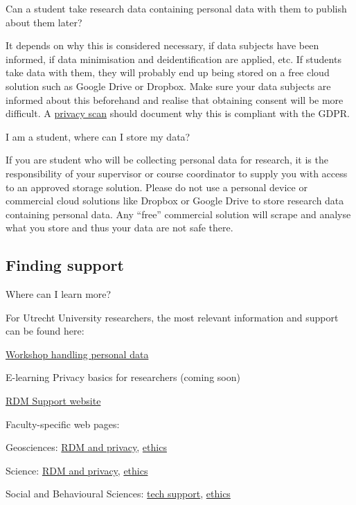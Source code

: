 \documentclass[
]{book}
\begin{document}
Can a student take research data containing personal data with them to publish about them later?

It depends on why this is considered necessary, if data subjects have been informed, if data minimisation and deidentification are applied, etc. If students take data with them, they will probably end up being stored on a free cloud solution such as Google Drive or Dropbox. Make sure your data subjects are informed about this beforehand and realise that obtaining consent will be more difficult. A \protect\hyperlink{privacy-scan}{privacy scan} should document why this is compliant with the GDPR.

I am a student, where can I store my data?

If you are student who will be collecting personal data for research, it is the responsibility of your supervisor or course coordinator to supply you with access to an approved storage solution. Please do not use a personal device or commercial cloud solutions like Dropbox or Google Drive to store research data containing personal data. Any ``free'' commercial solution will scrape and analyse what you store and thus your data are not safe there.

\hypertarget{support}{%
\subsection{Finding support}\label{support}}

Where can I learn more?

For Utrecht University researchers, the most relevant information and support can be found here:

\href{https://www.uu.nl/en/research/research-data-management/training-workshops/handling-personal-data-in-research}{Workshop handling personal data}

E-learning Privacy basics for researchers (coming soon)

\href{https://www.uu.nl/rdm}{RDM Support website}

Faculty-specific web pages:

Geosciences: \href{https://geo-data-support.sites.uu.nl/}{RDM and privacy}, \href{https://sciencegeo-erb.sites.uu.nl/}{ethics}

Science: \href{https://science-data-support.sites.uu.nl/}{RDM and privacy}, \href{https://sciencegeo-erb.sites.uu.nl/}{ethics}

Social and Behavioural Sciences: \href{https://techsupport.fss.uu.nl/}{tech support}, \href{https://ferb.sites.uu.nl/}{ethics}
\end{document}
